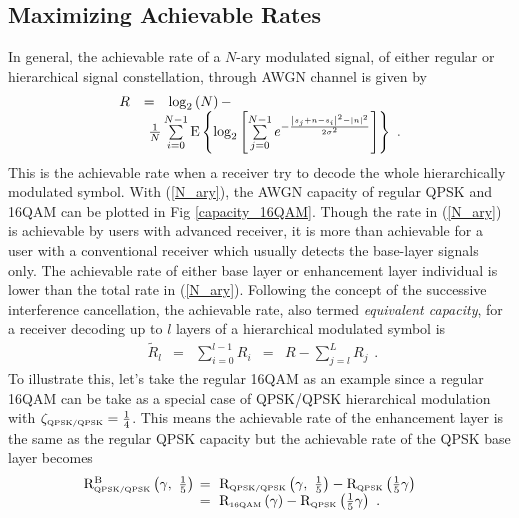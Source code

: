 \documentclass[conference]{IEEEtran}
\begin{document}
\subsection{Maximizing Achievable Rates~\label{Info_Theory}}
In general, the achievable rate of a $N$-ary modulated signal, of
either regular or hierarchical signal constellation, through AWGN
channel is given by~\cite{Unge82}
\begin{equation}
\begin{array}{lcl}
R&=&\log_{2}\left(N\right)-\\
&&\hspace{-0.20in}\frac{1}{N}\sum\limits_{i=0}^{N-1}\mbox{E}\left\{\log_{2}\left[\sum\limits_{j=0}^{N-1}e^{-\frac{\left|s_{j}+n-s_{i}\right|^2-\left|n\right|^2}{2\sigma^2}}\right]\right\}\
.
\end{array}\label{N_ary}
\end{equation}
\noindent This is the achievable rate when a receiver try to
decode the whole hierarchically modulated symbol. With
(\ref{N_ary}), the AWGN capacity of regular QPSK and 16QAM can be
plotted in Fig \ref{capacity_16QAM}. Though the rate in
(\ref{N_ary}) is achievable by users with advanced receiver, it is
more than achievable for a user with a conventional receiver which
usually detects the base-layer signals only. The achievable rate
of either base layer or enhancement layer individual is lower than
the total rate in (\ref{N_ary}). Following the concept of the
successive interference cancellation, the achievable rate, also
termed {\em equivalent capacity}, for a receiver decoding up to
$l$ layers of a hierarchical modulated symbol is~\cite{Huber94}
\begin{equation}
\begin{array}{rcccl}
\tilde{R}_{l}&=&\sum\limits_{i=0}^{l-1}R_{i}& = &
R-\sum\limits_{j=l}^{L}{R}_{j}
\end{array}.\label{R_equiv}
\end{equation}
\noindent To illustrate this, let's take the regular 16QAM as an
example since a regular 16QAM can be take as a special case of
QPSK/QPSK hierarchical modulation with $\zeta_{\mbox{\tiny
QPSK/QPSK}}=\frac{1}{4}$. This means the achievable rate of the
enhancement layer is the same as the regular QPSK capacity but the
achievable rate of the QPSK base layer becomes
\begin{equation}\hspace{-0.2in}
\begin{array}{rl}
{\rm R}_{\mbox{\tiny QPSK/QPSK}}^{\rm B}\left(\gamma,\
\frac{1}{5}\right)&\hspace{-0.08in}=\ {\rm R}_{\mbox{\tiny
QPSK/QPSK}}\left(\gamma,\
\frac{1}{5}\right)-{\rm R}_{\mbox{\tiny QPSK}} \left(\frac{1}{5}\gamma\right)\\
&\hspace{-0.08in}=\ {\rm R}_{\mbox{\tiny
16QAM}}\left(\gamma\right)-{\rm R}_{\mbox{\tiny
QPSK}}\left(\frac{1}{5}\gamma\right)\ .
\end{array}\label{R_16QAM_B1}
\end{equation}
\end{document}
